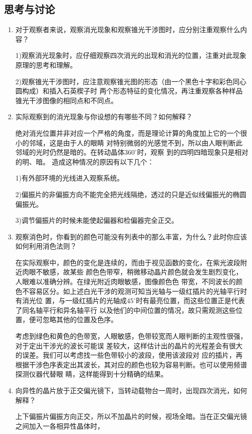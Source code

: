 \documentclass[11pt,a4paper]{article}
\begin{document}
\begin{spacing}{1.3}
\begin{CJK*}{UTF8}{gbsn}
\section{思考与讨论}
\begin{enumerate}
\item 对于观察者来说，观察消光现象和观察锥光干涉图时，应分别注重观察什么内容？\par 
1)观察消光现象时，应仔细观察四次消光的出现和消光的位置，注重对此现象原理的思考和理解。\par  
2)观察锥光干涉图时，应注意观察锥光图的形态（由一个黑色十字和彩色同心圆构成）和插入石英楔子时
两个形态特征的变化情况，再注重观察各种样品锥光干涉图像的相同点和不同点。\par 
\item 实际观察到的消光现象与你设想的有哪些不同？如何解释？\par 
绝对消光位置并非对应一个严格的角度，而是理论计算的角度加上它的一个很小的邻域，这是由于人的眼睛
对特别微弱的光感觉不到，所以由人眼判断此邻域的光时仍然是暗的。在转动晶体$360^{\circ}$时，观察
到的四明四暗现象只是相对的明、暗。 造成这种情况的原因有以下几个：\par 
1)有外部环境的光线进入观察系统。 \par
2)偏振片的非偏振方向不能完全把光线隔绝，透过的只是近似线偏振光的椭圆偏振光。\par  
3)调节偏振片的时候未能使起偏器和检偏器完全正交。
\item 观察消色时，你看到的颜色可能没有列表中的那么丰富，为什么？此时你应该如何利用消色法则？\par 
在实际观察中，颜色的变化是连续的，而由于视见函数的变化，在紫光波段附近肉眼不敏感，故某些
颜色色带窄，稍微移动晶片颜色就会发生剧烈变化，人眼难以准确分辨。在绿光附近肉眼敏感，图像颜色色
带宽，不同波长的颜色不容易区分。如上述白光干涉的观测可知当光轴与一级红插片的光轴平行时有消光位
置，与一级红插片的光轴成$45^{\circ}$时有最亮位置，而这些位置正是代表了同名轴平行和异名轴平行
以及他们的中间位置的情况，故只需观测这些位置，便可忽略其他的位置及色序。 \par 
考虑到绿色和黄色的色带宽，人眼敏感，色带较宽而人眼判断的主观性很强，对于定出干涉光的波长可能误
差较大，这样估计出的晶片的光程差会有很大的误差。我们可以考虑找一些色带较小的波段，使用该波段对
应的插片，再根据干涉色序表定出其波长，其对应的颜色也较为容易判断。也可以使用频谱探测仪器代替眼
睛，这样能得到十分精确的结果。
\item 向异性的晶片放于正交偏光镜下，当转动载物台一周时，出现四次消光，如何解释？\par 
上下偏振片偏振方向正交，所以不加晶片的时候，视场全暗。当在正交偏光镜之间加入一各相异性晶体时，

\end{enumerate}
\end{CJK*}
\end{spacing}
\end{document}
